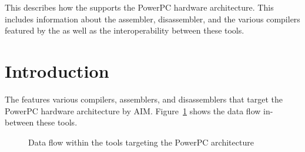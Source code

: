 




\renewcommand{\seeppc}{}

{This \documentation{} describes how the \ecs{} supports the PowerPC hardware architecture.
This includes information about the assembler, disassembler, and the various compilers featured by the \ecs{} as well as the interoperability between these tools.}

\section{Introduction}

The \ecs{} features various compilers, assemblers, and disassemblers that target the PowerPC hardware architecture by AIM\@.
Figure~\ref{fig:ppcdataflow} shows the data flow in-between these tools.

\begin{figure}
\caption{Data flow within the tools targeting the PowerPC architecture}
\label{fig:ppcdataflow}
\end{figure}

